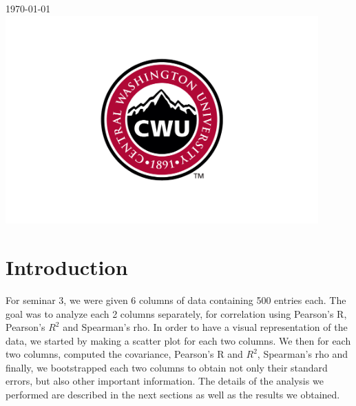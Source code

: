 \documentclass[12pt]{article}
\begin{document}
\begin{titlepage}
		
		
		{\large \today}\\ %
		
		
		\includegraphics[width=12cm]{CWU-Logo.png}\\[.5cm] %
		
		
		\vfill %
		
	\end{titlepage}
	\newpage
	\tableofcontents
	\newpage
	
	
	
	\section{Introduction}
		For seminar 3, we were given 6 columns of data containing 500 entries each. The goal was to analyze each 2 columns separately, for correlation using Pearson's R, Pearson's $R^2$ and Spearman's rho. In order to have a visual representation of the data, we started by making a scatter plot for each two columns. We then for each two columns, computed the covariance, Pearson's R and $R^2$, Spearman's rho and finally, we bootstrapped each two columns to obtain not only their standard errors, but also other important information. The details of the analysis we performed are described in the next sections as well as the results we obtained.
		
\end{document}
